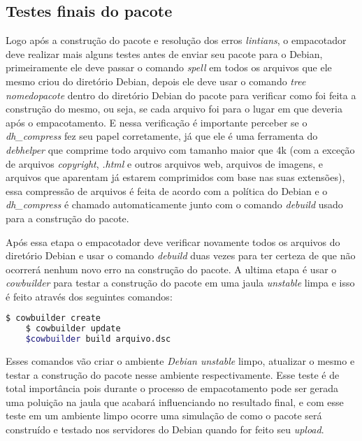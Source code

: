 \subsection{Testes finais do pacote}

Logo após a construção do pacote e resolução dos erros \textit{lintians}, o empacotador deve realizar mais alguns testes antes de enviar seu pacote para o Debian, primeiramente ele deve passar o comando \textit{spell} em todos os arquivos que ele mesmo criou do diretório Debian, depois ele deve usar o comando \textit{tree nomedopacote} dentro do diretório Debian do pacote para verificar como foi feita a construção do mesmo, ou seja, se cada arquivo foi para o lugar em que deveria após o empacotamento. E nessa verificação é importante perceber se o \textit{dh\_compress} fez seu papel corretamente, já que ele é uma ferramenta do \textit{debhelper} que comprime todo arquivo com tamanho maior que 4k (com a exceção de arquivos \textit{copyright}, \textit{.html} e outros arquivos web, arquivos de imagens, e arquivos que aparentam já estarem comprimidos com base nas suas extensões), essa compressão de arquivos é feita de acordo com a política do Debian e o \textit{dh\_compress} é chamado automaticamente junto com o comando \textit{debuild} usado para a construção do pacote.

Após essa etapa o empacotador deve verificar novamente todos os arquivos do diretório Debian e usar o comando \textit{debuild} duas vezes para ter certeza de que não ocorrerá nenhum novo erro na construção do pacote. A ultima etapa é usar o \textit{cowbuilder} para testar a construção do pacote em uma jaula \textit{unstable} limpa e isso é feito através dos seguintes comandos:

\begin{lstlisting}[language=bash]
	$ cowbuilder create
	$ cowbuilder update
	$cowbuilder build arquivo.dsc
\end{lstlisting} 

Esses comandos vão criar o ambiente \textit{Debian unstable} limpo, atualizar o mesmo e testar a construção do pacote nesse ambiente respectivamente. Esse teste é de total importância pois durante o processo de empacotamento pode ser gerada uma poluição na jaula que acabará influenciando no resultado final, e com esse teste em um ambiente limpo ocorre uma simulação de como o pacote será construído e testado nos servidores do Debian quando for feito seu \textit{upload}.